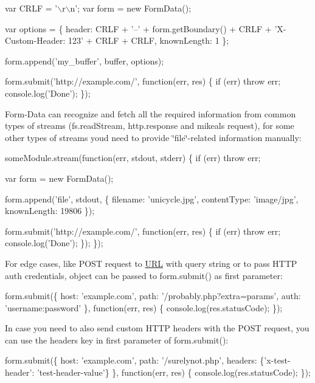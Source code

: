 \begin{DoxyCode}
var CRLF = '\(\backslash\)r\(\backslash\)n';
var form = new FormData();

var options = \{
  header: CRLF + '--' + form.getBoundary() + CRLF + 'X-Custom-Header: 123' + CRLF + CRLF,
  knownLength: 1
\};

form.append('my\_buffer', buffer, options);

form.submit('http://example.com/', function(err, res) \{
  if (err) throw err;
  console.log('Done');
\});
\end{DoxyCode}


Form-\/\+Data can recognize and fetch all the required information from common types of streams ({\ttfamily fs.\+read\+Stream}, {\ttfamily http.\+response} and {\ttfamily mikeal\textquotesingle{}s request}), for some other types of streams you\textquotesingle{}d need to provide \char`\"{}file\char`\"{}-\/related information manually\+:


\begin{DoxyCode}
someModule.stream(function(err, stdout, stderr) \{
  if (err) throw err;

  var form = new FormData();

  form.append('file', stdout, \{
    filename: 'unicycle.jpg',
    contentType: 'image/jpg',
    knownLength: 19806
  \});

  form.submit('http://example.com/', function(err, res) \{
    if (err) throw err;
    console.log('Done');
  \});
\});
\end{DoxyCode}


For edge cases, like P\+O\+ST request to \mbox{\hyperlink{namespace_u_r_l}{U\+RL}} with query string or to pass H\+T\+TP auth credentials, object can be passed to {\ttfamily form.\+submit()} as first parameter\+:


\begin{DoxyCode}
form.submit(\{
  host: 'example.com',
  path: '/probably.php?extra=params',
  auth: 'username:password'
\}, function(err, res) \{
  console.log(res.statusCode);
\});
\end{DoxyCode}


In case you need to also send custom H\+T\+TP headers with the P\+O\+ST request, you can use the {\ttfamily headers} key in first parameter of {\ttfamily form.\+submit()}\+:


\begin{DoxyCode}
form.submit(\{
  host: 'example.com',
  path: '/surelynot.php',
  headers: \{'x-test-header': 'test-header-value'\}
\}, function(err, res) \{
  console.log(res.statusCode);
\});
\end{DoxyCode}


